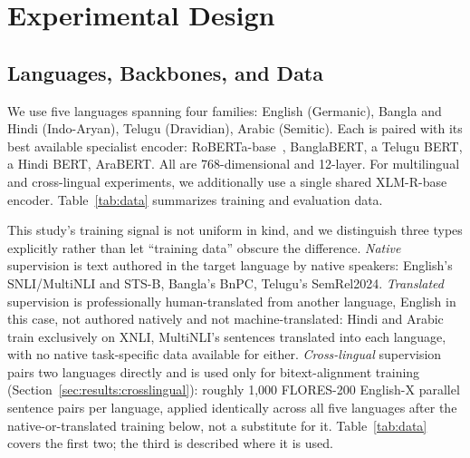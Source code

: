 \documentclass[manuscript]{acmart}
\begin{document}
\section{Experimental Design}
\label{sec:experiments}

\subsection{Languages, Backbones, and Data}

We use five languages spanning four families: English (Germanic), Bangla and Hindi (Indo-Aryan), Telugu (Dravidian), Arabic (Semitic). Each is paired with its best available specialist encoder: RoBERTa-base~\citep{liu2019roberta}, BanglaBERT, a Telugu BERT, a Hindi BERT, AraBERT. All are 768-dimensional and 12-layer. For multilingual and cross-lingual experiments, we additionally use a single shared XLM-R-base~\citep{conneau2020xlmr} encoder. Table~\ref{tab:data} summarizes training and evaluation data.

This study's training signal is not uniform in kind, and we distinguish three types explicitly rather than let ``training data'' obscure the difference. \emph{Native} supervision is text authored in the target language by native speakers: English's SNLI/MultiNLI and STS-B, Bangla's BnPC, Telugu's SemRel2024. \emph{Translated} supervision is professionally human-translated from another language, English in this case, not authored natively and not machine-translated: Hindi and Arabic train exclusively on XNLI, MultiNLI's sentences translated into each language, with no native task-specific data available for either. \emph{Cross-lingual} supervision pairs two languages directly and is used only for bitext-alignment training (Section~\ref{sec:results:crosslingual}): roughly 1,000 FLORES-200 English-X parallel sentence pairs per language, applied identically across all five languages after the native-or-translated training below, not a substitute for it. Table~\ref{tab:data} covers the first two; the third is described where it is used.
\end{document}

